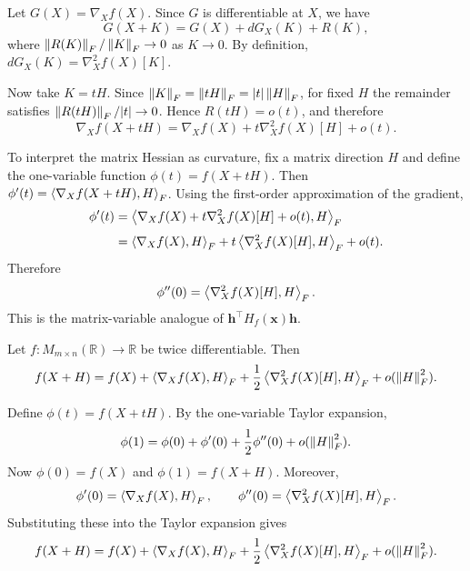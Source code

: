 \begin{pfbox}
Let $G(X)=\nabla_X f(X)$. Since $G$ is differentiable at $X$, we have
\[
    G(X+K)
    =
    G(X)
    +
    dG_X(K)
    +
    R(K),
\]
where $\left\lVert R(K) \right\rVert_F/\left\lVert K \right\rVert_F\to 0$ as $K\to 0$.
By definition, $dG_X(K)=\nabla_X^2 f(X)[K]$.

Now take $K=tH$. Since $\left\lVert K \right\rVert_F=\left\lVert tH \right\rVert_F=|t|\left\lVert H \right\rVert_F$, for fixed $H$ the
remainder satisfies $\left\lVert R(tH) \right\rVert_F/|t|\to 0$. Hence $R(tH)=o(t)$, and therefore
\[
    \nabla_X f(X+tH)
    =
    \nabla_X f(X)
    +
    t\nabla_X^2 f(X)[H]
    +
    o(t).
\]
\end{pfbox}

To interpret the matrix Hessian as curvature, fix a matrix direction $H$ and
define the one-variable function $\phi(t)=f(X+tH)$. Then
$\phi'(t)=\left\langle \nabla_X f(X+tH), H \right\rangle_F$. Using the first-order
approximation of the gradient,
\[
\begin{aligned}
    \phi'(t)
    &=
    \left\langle 
        \nabla_X f(X)
        +
        t\nabla_X^2f(X)[H]
        +
        o(t)
    , H \right\rangle_F                                                       \\[1mm]
    &=
    \left\langle \nabla_X f(X), H \right\rangle_F
    +
    t\left\langle \nabla_X^2f(X)[H], H \right\rangle_F
    +
    o(t).
\end{aligned}
\]
Therefore
\[
    \phi''(0)
    =
    \left\langle \nabla_X^2f(X)[H], H \right\rangle_F.
\]
This is the matrix-variable analogue of
$\mathbf{h}^\top H_f(\mathbf{x})\mathbf{h}$.



\begin{proposition}
Let $f:M_{m\times n}(\mathbb{R})\to\mathbb{R}$ be twice differentiable. Then
\[
    f(X+H)
    =
    f(X)
    +
    \left\langle \nabla_X f(X), H \right\rangle_F
    +
    \frac12\left\langle \nabla_X^2f(X)[H], H \right\rangle_F
    +
    o(\left\lVert H \right\rVert_F^2).
\]
\end{proposition}

\begin{pfbox}
Define $\phi(t)=f(X+tH)$. By the one-variable Taylor expansion,
\[
    \phi(1)
    =
    \phi(0)+\phi'(0)+\frac12\phi''(0)+o(\left\lVert H \right\rVert_F^2).
\]
Now $\phi(0)=f(X)$ and $\phi(1)=f(X+H)$. Moreover,
\[
    \phi'(0)
    =
    \left\langle \nabla_X f(X), H \right\rangle_F,
    \qquad
    \phi''(0)
    =
    \left\langle \nabla_X^2f(X)[H], H \right\rangle_F.
\]
Substituting these into the Taylor expansion gives
\[
    f(X+H)
    =
    f(X)
    +
    \left\langle \nabla_X f(X), H \right\rangle_F
    +
    \frac12\left\langle \nabla_X^2f(X)[H], H \right\rangle_F
    +
    o(\left\lVert H \right\rVert_F^2).
\]
\end{pfbox}

